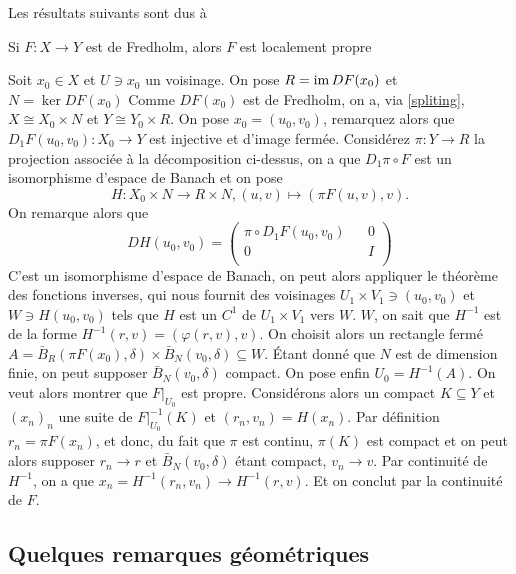\documentclass[memoire.tex]{subfiles}
\begin{document}
Les résultats suivants sont dus à  \cite{Smale1965Sard}
\begin{proposition}\label{propre-fred}
    Si $F:X\rightarrow Y$ est de Fredholm, alors $F$ est localement propre
\end{proposition}
\begin{preuve}
Soit $x_0\in X$ et $U\ni x_0$ un voisinage. On pose $R=\operatorname{im} DF(x_0)$ et $N=\ker DF(x_0)$
Comme $DF(x_0)$ est de Fredholm, on a, via \ref{spliting}, $X\cong X_0\times N $ et $Y\cong Y_0\times R$. On pose $x_0=(u_0,v_0)$, remarquez alors que $D_1F(u_0,v_0): X_0\rightarrow Y$ est injective et d'image fermée. Considérez $\pi: Y\rightarrow R$ la projection associée à la décomposition ci-dessus, on a que $D_1\pi\circ F$ est un isomorphisme d'espace de Banach et on pose
\begin{equation*}
    H: X_0\times N\rightarrow R\times N, (u,v)\mapsto (\pi F(u,v),v).
\end{equation*}
On remarque alors que
\begin{equation*}
    DH(u_0,v_0)=\begin{pmatrix}
        \pi\circ D_1F(u_0,v_0) && 0\\
        0 && I\\
    \end{pmatrix}
\end{equation*}
C'est un isomorphisme d'espace de Banach, on peut alors appliquer le théorème des fonctions inverses, qui nous fournit des voisinages $U_1\times V_1\ni (u_0,v_0) $ et $W\ni H(u_0,v_0)$ tels que $H$ est un $C^1$ de $U_1\times V_1$ vers $W$. $W$, on sait que $H^{-1}$ est de la forme $H^{-1}(r,v)=(\varphi(r,v),v)$. On choisit alors un rectangle fermé $A=\bar{B}_{R}(\pi F(x_0),\delta)\times \bar{B}_{N}(v_0,\delta) \subseteq W$. Étant donné que $N$ est de dimension finie, on peut supposer $\bar{B}_{N}(v_0,\delta)$ compact. On pose enfin $U_0=H^{-1}(A)$. On veut alors montrer que $F|_{U_0}$ est propre. Considérons alors un compact $K\subseteq  Y$ et $(x_n)_{n}$ une suite de $F|_{U_0}^{-1}(K)$ et  $(r_n,v_n)=H(x_n)$. Par définition $r_n=\pi F(x_n)$, et donc, du fait que $\pi$ est continu, $\pi(K)$ est compact et on peut alors supposer $r_n\to r$ et $\bar{B}_{N}(v_0,\delta)$  étant compact,  $v_n\to v$. Par continuité de $H^{-1}$, on a que $x_n=H^{-1}(r_n,v_n)\to H^{-1}(r,v)$.  Et on conclut par la continuité de $F$.
\end{preuve}

\subsection{Quelques remarques géométriques }
\end{document}
